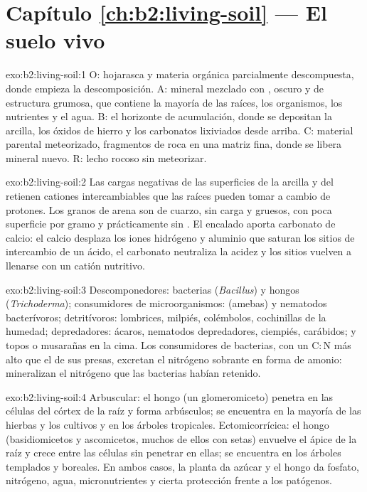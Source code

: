\section*{Capítulo \ref{ch:b2:living-soil} --- El suelo vivo}

\begin{solution}{exo:b2:living-soil:1}
O: hojarasca y materia orgánica parcialmente descompuesta, donde empieza la
descomposición. A:  mineral mezclado con , oscuro y de estructura
grumosa, que contiene la mayoría de las raíces, los organismos, los
nutrientes y el agua. B: el horizonte de acumulación, donde se depositan
la arcilla, los óxidos de hierro y los carbonatos lixiviados desde arriba.
C: material parental meteorizado, fragmentos de roca en una matriz fina,
donde se libera  mineral nuevo. R: lecho rocoso sin meteorizar.
\end{solution}

\begin{solution}{exo:b2:living-soil:2}
Las cargas negativas de las superficies de la arcilla y del  retienen
cationes intercambiables que las raíces pueden tomar a cambio de protones.
Los granos de arena son de cuarzo, sin carga y gruesos, con poca superficie
por gramo y prácticamente sin . El encalado aporta carbonato de
calcio: el calcio desplaza los iones hidrógeno y aluminio que saturan los
sitios de intercambio de un  ácido, el carbonato neutraliza la acidez
y los sitios vuelven a llenarse con un catión nutritivo.
\end{solution}

\begin{solution}{exo:b2:living-soil:3}
Descomponedores: bacterias (\emph{Bacillus}) y hongos
(\emph{Trichoderma}); consumidores de microorganismos:  (amebas)
y nematodos bacterívoros; detritívoros: lombrices, milpiés, colémbolos,
cochinillas de la humedad; depredadores: ácaros, nematodos depredadores,
ciempiés, carábidos; y topos o musarañas en la cima. Los consumidores de
bacterias, con un $\mathrm{C:N}$ más alto que el de sus presas, excretan el
nitrógeno sobrante en forma de amonio: mineralizan el nitrógeno que las
bacterias habían retenido.
\end{solution}

\begin{solution}{exo:b2:living-soil:4}
Arbuscular: el hongo (un glomeromiceto) penetra en las células del córtex
de la raíz y forma arbúsculos; se encuentra en la mayoría de las hierbas y
los cultivos y en los árboles tropicales. Ectomicorrícica: el hongo
(basidiomicetos y ascomicetos, muchos de ellos con setas) envuelve el ápice
de la raíz y crece entre las células sin penetrar en ellas; se encuentra en
los árboles templados y boreales. En ambos casos, la planta da azúcar y el
hongo da fosfato, nitrógeno, agua, micronutrientes y cierta protección
frente a los patógenos.
\end{solution}

